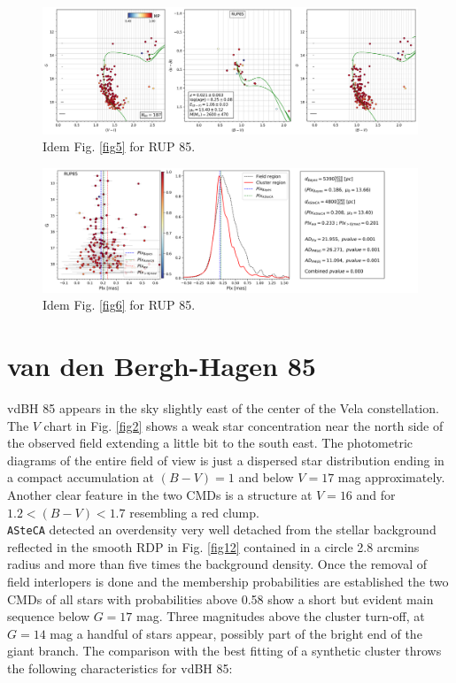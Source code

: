 \documentclass[draft]{aa}
\begin{document}
\begin{figure}[ht]
    \centering
    \includegraphics[width=\hsize]{../figs/cmds_rup85.png}
    \caption{Idem Fig. \ref{fig5} for RUP 85.}
    \label{fig9}
\end{figure}

\begin{figure}[ht]
    \centering
    \includegraphics[width=\hsize]{../figs/plx_RUP85.png}
    \caption{Idem Fig. \ref{fig6} for RUP 85.}
    \label{fig10}
\end{figure}



\section{van den Bergh-Hagen 85}

vdBH 85 appears in the sky slightly east of the center of the
Vela constellation. The $V$ chart in Fig. \ref{fig2} shows a weak star
concentration near the north side of the observed field extending a little bit
to the south east. The photometric diagrams of the entire field of view is just
a dispersed star distribution ending in a compact accumulation at $(B-V)=1$ and
below $V = 17$ mag approximately. Another clear feature in the two CMDs is a
structure at $V = 16$ and for $1.2 < (B-V) < 1.7$ resembling a red clump.\\

\texttt{ASteCA} detected an overdensity very well detached from the stellar
background reflected in the smooth RDP in Fig. \ref{fig12} contained in a circle
2.8 arcmins radius and more than five times the background density. Once the
removal of field interlopers is done and the membership probabilities are
established the two CMDs of all stars with probabilities above 0.58 show a
short but evident main sequence below $G=17$ mag.
Three magnitudes above the cluster turn-off, at $G=14$ mag a handful of stars
appear, possibly part of the bright end of the giant branch. The comparison
with the best fitting of a synthetic cluster throws the following
characteristics for vdBH 85:
\end{document}
